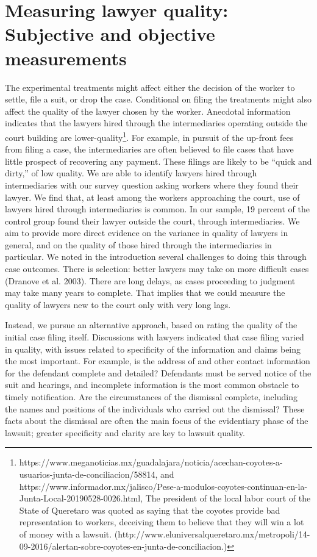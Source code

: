 \documentclass[oneside,12pt]{article}
\begin{document}
\section{Measuring lawyer quality: Subjective and objective measurements}
\label{sec:measuring}
The experimental treatments might affect either the decision of the worker to settle, file a suit, or drop the case. Conditional on filing the treatments might also affect the quality of the lawyer chosen by the worker. Anecdotal information indicates that the lawyers hired through the intermediaries operating outside the court building are lower-quality\footnote{https://www.meganoticias.mx/guadalajara/noticia/acechan-coyotes-a-usuarios-junta-de-conciliacion/58814, and https://www.informador.mx/jalisco/Pese-a-modulos-coyotes-continuan-en-la-Junta-Local-20190528-0026.html, The president of the local labor court of the State of Queretaro was quoted as saying that the coyotes provide bad representation to workers, deceiving them to believe that they will win a lot of money with a lawsuit. (http://www.eluniversalqueretaro.mx/metropoli/14-09-2016/alertan-sobre-coyotes-en-junta-de-conciliacion.)}.  For example, in pursuit of the up-front fees from filing a case, the intermediaries are often believed to file cases that have little prospect of recovering any payment. These filings are likely to be “quick and dirty,” of low quality. We are able to identify lawyers hired through intermediaries with our survey question asking workers where they found their lawyer. We find that, at least among the workers approaching the court, use of lawyers hired through intermediaries is common. In our sample, 19 percent of the control group found their lawyer outside the court, through intermediaries. We aim to provide more direct evidence on the variance in quality of lawyers in general, and on the quality of those hired through the intermediaries in particular. We noted in the introduction several challenges to doing this through case outcomes. There is selection: better lawyers may take on more difficult cases (Dranove et al. 2003). There are long delays, as cases proceeding to judgment may take many years to complete. That implies that we could measure the quality of lawyers new to the court only with very long lags. 

Instead, we pursue an alternative approach, based on rating the quality of the initial case filing itself. Discussions with lawyers indicated that case filing varied in quality, with issues related to specificity of the information and claims being the most important. For example, is the address of and other contact information for the defendant complete and detailed? Defendants must be served notice of the suit and hearings, and incomplete information is the most common obstacle to timely notification. Are the circumstances of the dismissal complete, including the names and positions of the individuals who carried out the dismissal? These facts about the dismissal are often the main focus of the evidentiary phase of the lawsuit; greater specificity and clarity are key to lawsuit quality. 
\end{document}
